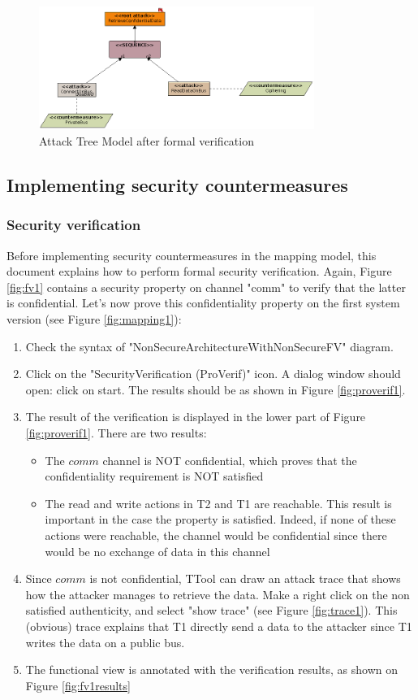 \documentclass[12pt]{article}
\begin{document}
\begin{figure}[htbp]
\centering
\includegraphics[width=0.8\textwidth]{fig/attacktree_verif2.png}
\caption{Attack Tree Model after formal verification} \label{fig:attacktree_verif2}
\end{figure}

\subsection{Implementing security countermeasures}

\subsubsection{Security verification}
Before implementing security countermeasures in the mapping model, this document explains how to perform formal security
 verification. Again, Figure \ref{fig:fv1} contains a security property on channel "comm" to verify that the latter is confidential. Let's now prove this confidentiality property on the first system version (see Figure \ref{fig:mapping1}):
\begin{enumerate}
\item Check the syntax of "NonSecureArchitectureWithNonSecureFV" diagram.
\item Click on the "SecurityVerification (ProVerif)" icon. A dialog window should open: click on start. The results should be as shown in Figure \ref{fig:proverif1}.
\item The result of the verification is displayed in the lower part of Figure \ref{fig:proverif1}. There are two results:
\begin{itemize}
\item The $comm$ channel is NOT confidential, which proves that the confidentiality requirement is NOT satisfied
\item The read and write actions in T2 and T1 are reachable. This result is important in the case the property is satisfied. Indeed, if none of these actions were reachable, the channel would be confidential since there would be no exchange of data in this channel
\end{itemize}
\item Since $comm$ is not confidential, TTool can draw an attack trace that shows how the attacker manages to retrieve the data. Make a right click on the non satisfied authenticity, and select "show trace" (see Figure \ref{fig:trace1}). This (obvious) trace explains that T1 directly send a data to the attacker since T1 writes the data on a public bus.
\item The functional view is annotated with the verification results, as shown on Figure \ref{fig:fv1results}
\end{enumerate}
\end{document}
